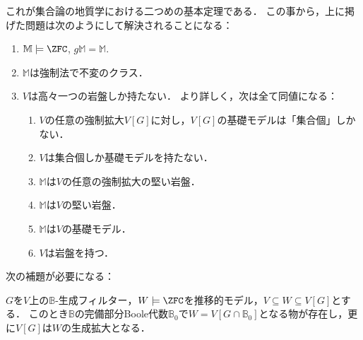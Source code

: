 \documentclass[a4j,leqno]{ltjsarticle}
\newcommand{\M}{\mathbb{M}}
\newcommand{\gM}{g\mathbb{M}}
\theoremstyle{nonumberplain}
\begin{document}
これが集合論の地質学における二つめの基本定理である．
この事から，上に掲げた問題は次のようにして解決されることになる：
\begin{theorem}\label{thm:conseq-of-ddg}
 \begin{enumerate}
  \item\label{item:M-zfc-gM=M} $\M \models \ZFC$, $\gM = \M$.
  \item\label{item:M-invariant} $\M$は強制法で不変のクラス．
  \item\label{item:bedrocks} $V$は高々一つの岩盤しか持たない．
        より詳しく，次は全て同値になる：
  \begin{enumerate}
   \item\label{item:gen-set-many-grounds} $V$の任意の強制拡大$V[G]$に対し，$V[G]$の基礎モデルは「集合個」しかない．
   \item\label{item:set-many-grounds} $V$は集合個しか基礎モデルを持たない．
   \item\label{item:gen-M-solid-ground} $\M$は$V$の任意の強制拡大の堅い岩盤．
   \item\label{item:M-solid-ground} $\M$は$V$の堅い岩盤．
   \item\label{item:M-is-ground} $\M$は$V$の基礎モデル．
   \item\label{item:V-has-bedrock} $V$は岩盤を持つ．
  \end{enumerate}
 \end{enumerate}
\end{theorem}
次の補題が必要になる：
\begin{fact}\label{lem:interm-ext}
 $G$を$V$上の$\mathbb{B}$-生成フィルター，$W \models \ZFC$を推移的モデル，$V \subseteq W \subseteq V[G]$とする．
 このとき$\mathbb{B}$の完備部分Boole代数$\mathbb{B}_0$で$W = V[G \cap \mathbb{B}_0]$となる物が存在し，更に$V[G]$は$W$の生成拡大となる．
\end{fact}
\end{document}
